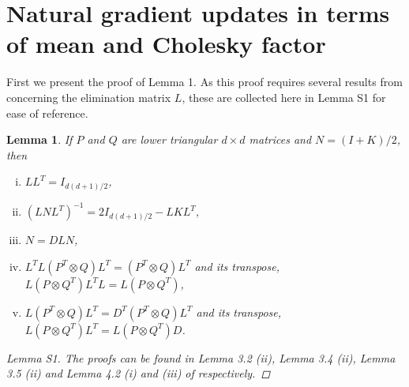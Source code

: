 \documentclass{statsoc}
\newtheorem{lemma}{Lemma}
\begin{document}
\section{Natural gradient updates in terms of mean and Cholesky factor} \label{S3}
First we present the proof of Lemma 1. As this proof requires several results from \cite{Magnus1980} concerning the elimination matrix $L$, these are collected here in Lemma S1 for ease of reference.  
\begin{lemma} \label{Lem_L}
If $P$ and $Q$ are lower triangular $d \times d$ matrices and $N = (I+K)/2$, then
\begin{enumerate}[(i)]
\item $L L^T = I_{d(d+1)/2}$,
\item $(L N L^T)^{-1} = 2I_{d(d+1)/2} -LKL^T$,
\item $N = D L N$,
\item $L^T L (P^T \otimes Q)L^T = (P^T \otimes Q) L^T$ and its transpose, $L (P \otimes Q^T)L^T L = L (P \otimes Q^T)$,
\item $L (P^T \otimes Q) L^T = D^T (P^T \otimes Q) L^T$ and its transpose, $L (P \otimes Q^T) L^T = L (P \otimes Q^T) D$.
\end{enumerate}
\begin{proof}[Lemma S1] 
The proofs can be found in Lemma 3.2 (ii), Lemma 3.4 (ii), Lemma 3.5 (ii) and Lemma 4.2 (i) and (iii) of \cite{Magnus1980} respectively.
\end{proof}
\end{lemma}
\end{document}

